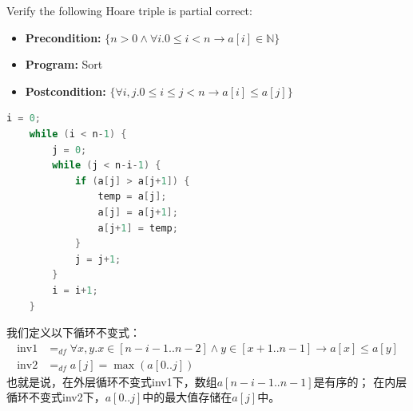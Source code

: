 \documentclass{article}
\title{\heiti{计算机逻辑基础}}
\author{第七次作业 \\ 
武泽恺 10225101429
}
\date{2025年12月27日}
\begin{document}
\maketitle

Verify the following Hoare triple is partial correct:

\begin{itemize}
    \item \textbf{Precondition:} $\{n > 0 \land \forall i. 0 \le i < n \to a[i] \in \mathbb{N}\}$
    \item \textbf{Program:} Sort
    \item \textbf{Postcondition:} $\{\forall i, j. 0 \le i \le j < n \to a[i] \le a[j]\}$
\end{itemize}

\begin{lstlisting}[language=c]
    i = 0;
    while (i < n-1) {
        j = 0;
        while (j < n-i-1) {
            if (a[j] > a[j+1]) {
                temp = a[j];
                a[j] = a[j+1];
                a[j+1] = temp;
            }
            j = j+1;
        }
        i = i+1;
    }
\end{lstlisting}

我们定义以下循环不变式：
\[
\begin{aligned}
\text{inv1} & =_{df} \forall x, y. x \in [n - i - 1 .. n - 2] \land y \in [x + 1 .. n - 1] \to a[x] \le a[y] \\
\text{inv2} & =_{df} a[j] = \max(a[0 .. j])
\end{aligned}
\]
也就是说，在外层循环不变式inv1下，数组$a[n-i-1 .. n-1]$是有序的；
在内层循环不变式inv2下，$a[0 .. j]$中的最大值存储在$a[j]$中。
\end{document}
